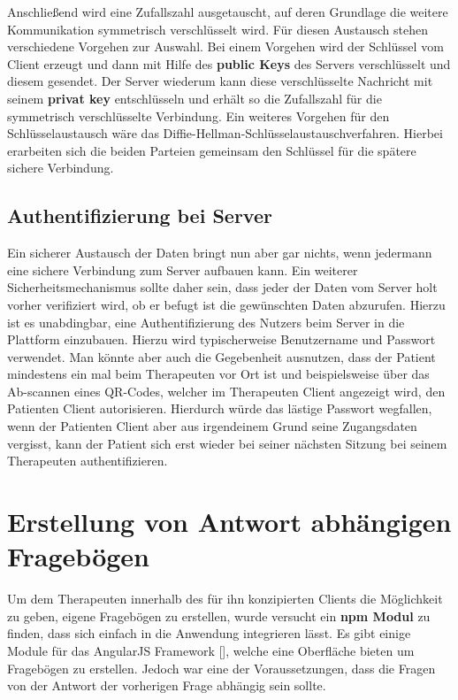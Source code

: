 Anschließend wird eine Zufallszahl ausgetauscht, auf deren Grundlage die weitere Kommunikation symmetrisch verschlüsselt wird. Für diesen Austausch stehen verschiedene Vorgehen zur Auswahl. Bei einem Vorgehen wird der Schlüssel vom Client erzeugt und dann mit Hilfe des \textbf{public Keys} des Servers verschlüsselt und diesem gesendet. Der Server wiederum kann diese verschlüsselte Nachricht mit seinem \textbf{privat key} entschlüsseln und erhält so die Zufallszahl für die symmetrisch verschlüsselte Verbindung. Ein weiteres Vorgehen für den Schlüsselaustausch wäre das Diffie-Hellman-Schlüsselaustauschverfahren. Hierbei erarbeiten sich die beiden Parteien gemeinsam den Schlüssel für die spätere sichere Verbindung.

\subsection{Authentifizierung bei Server}
Ein sicherer Austausch der Daten bringt nun aber gar nichts, wenn jedermann eine sichere Verbindung zum Server aufbauen kann. Ein weiterer Sicherheitsmechanismus sollte daher sein, dass jeder der Daten vom Server holt vorher verifiziert wird, ob er befugt ist die gewünschten Daten abzurufen.
Hierzu ist es unabdingbar, eine Authentifizierung des Nutzers beim Server in die Plattform einzubauen. Hierzu wird typischerweise Benutzername und Passwort verwendet. Man könnte aber auch die Gegebenheit ausnutzen, dass der Patient mindestens ein mal beim Therapeuten vor Ort ist und beispielsweise über das Ab-scannen eines QR-Codes, welcher im Therapeuten Client angezeigt wird, den Patienten Client autorisieren. Hierdurch würde das lästige Passwort wegfallen, wenn der Patienten Client aber aus irgendeinem Grund seine Zugangsdaten vergisst, kann der Patient sich erst wieder bei seiner nächsten Sitzung bei seinem Therapeuten authentifizieren.

\section{Erstellung von Antwort abhängigen Fragebögen}
Um dem Therapeuten innerhalb des für ihn konzipierten Clients die Möglichkeit zu geben, eigene Fragebögen zu erstellen, wurde versucht ein \textbf{npm Modul} zu finden, dass sich einfach in die Anwendung integrieren lässt. Es gibt einige Module für das AngularJS Framework [\cite{ANGULAR16}], welche eine Oberfläche bieten um Fragebögen zu erstellen. Jedoch war eine der Voraussetzungen, dass die Fragen von der Antwort der vorherigen Frage abhängig sein sollte.

